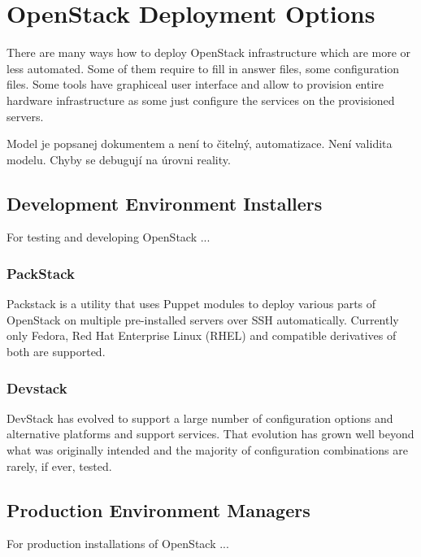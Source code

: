 \section{OpenStack Deployment Options}
\label{chap:openstack}

There are many ways how to deploy OpenStack infrastructure which are more or less automated. Some of them require to fill in answer files, some configuration files. Some tools have graphiceal user interface and allow to provision entire hardware infrastructure as some just configure the services on the provisioned servers.

Model je popsanej dokumentem a není to čitelný, automatizace. Není validita modelu. Chyby se debugují na úrovni reality.

\subsection{Development Environment Installers}

For testing and developing OpenStack ...

\subsubsection{PackStack}

Packstack is a utility that uses Puppet modules to deploy various parts of OpenStack on multiple pre-installed servers over SSH automatically. Currently only Fedora, Red Hat Enterprise Linux (RHEL) and compatible derivatives of both are supported.


\subsubsection{Devstack}

DevStack has evolved to support a large number of configuration options and alternative platforms and support services. That evolution has grown well beyond what was originally intended and the majority of configuration combinations are rarely, if ever, tested.


\subsection{Production Environment Managers}

For production installations of OpenStack ...

